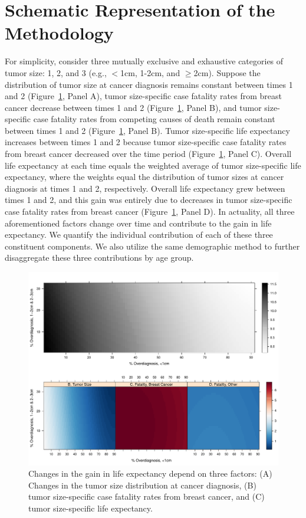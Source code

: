\documentclass[11pt,letterpaper]{article}
\theoremstyle{plain}
\theoremstyle{remark}
\numberwithin{equation}{section}
\begin{document}
\section{Schematic Representation of the Methodology}
For simplicity, consider three mutually exclusive and exhaustive
categories of tumor size: 1, 2, and 3 (e.g., $<$1cm, 1-2cm, and
$\geq$2cm).  Suppose the distribution of tumor size at cancer
diagnosis remains constant between times 1 and 2
(Figure~\ref{fig:simple_case}, Panel A), tumor size-specific case
fatality rates from breast cancer decrease between times 1 and 2
(Figure~\ref{fig:simple_case}, Panel B), and tumor size-specific case
fatality rates from competing causes of death remain constant between
times 1 and 2 (Figure~\ref{fig:simple_case}, Panel B).  Tumor
size-specific life expectancy increases between times 1 and 2 because
tumor size-specific case fatality rates from breast cancer decreased
over the time period (Figure~\ref{fig:simple_case}, Panel C).  Overall
life expectancy at each time equals the weighted average of tumor
size-specific life expectancy, where the weights equal the
distribution of tumor sizes at cancer diagnosis at times 1 and 2,
respectively.  Overall life expectancy grew between times 1 and 2, and
this gain was entirely due to decreases in tumor size-specific case
fatality rates from breast cancer (Figure~\ref{fig:simple_case}, Panel
D).  In actuality, all three aforementioned factors change over time
and contribute to the gain in life expectancy.  We quantify the
individual contribution of each of these three constituent components.
We also utilize the same demographic method to further disaggregate
these three contributions by age group.
\begin{figure}[h]
\begin{center}
\includegraphics[trim=0 220 0 0,clip,width=\linewidth]{appendix_figure1}
\caption{Changes in the gain in life expectancy depend on three factors: (A) Changes in the tumor size distribution at cancer diagnosis, (B) tumor size-specific case fatality rates from breast cancer, and (C) tumor size-specific life expectancy.} 
\label{fig:simple_case}
\end{center}
\end{figure}
\end{document}
